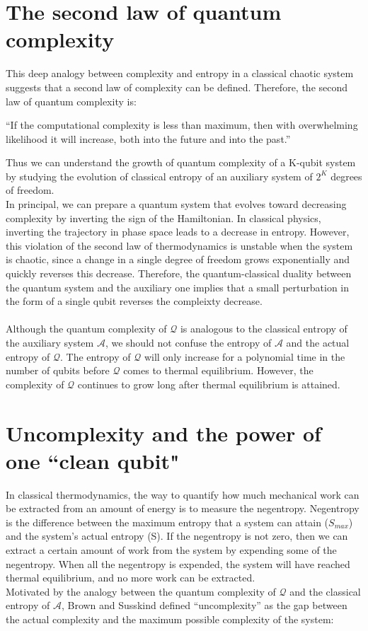 \section{The second law of quantum complexity}
This deep analogy between complexity and entropy in a classical chaotic system suggests that a second law of complexity can be defined. Therefore, the second law of quantum complexity \cite{brown2018second} is: 
\begin{adjustwidth}{0.5cm}{0pt}
 ``If the computational complexity is less than maximum, then with overwhelming likelihood it will increase, both into the future and into the past.''
\end{adjustwidth}
Thus we can understand the growth of quantum complexity of a K-qubit system by studying the evolution of classical entropy of an auxiliary system of $2^K$ degrees of freedom.
\\
In principal, we can prepare a quantum system that evolves toward decreasing complexity by inverting the sign of the Hamiltonian. In classical physics, inverting the trajectory in phase space leads to a decrease in entropy. However, this violation of the second law of thermodynamics is unstable when the system is chaotic, since a change in a single degree of freedom grows exponentially and quickly reverses this decrease. Therefore, the quantum-classical duality between the quantum system and the auxiliary one implies that a small perturbation in the form of a single qubit reverses the compleixty decrease.
\\
\\
Although the quantum complexity of $\mathcal{Q}$ is analogous to the classical entropy of the auxiliary system $\mathcal{A}$, we should not confuse the entropy of $\mathcal{A}$ and the actual entropy of $\mathcal{Q}$. The entropy of $\mathcal{Q}$ will only increase for a polynomial time in the number of qubits before $\mathcal{Q}$ comes to thermal equilibrium. However, the complexity of $\mathcal{Q}$ continues to grow long after thermal equilibrium is attained. 

\section{Uncomplexity and the power of one ``clean qubit"}
In classical thermodynamics, the way to quantify how much mechanical work can be extracted from an amount of energy is to measure the negentropy. Negentropy is the difference between the maximum entropy that a system can attain ($S_{max}$) and the system’s actual entropy (S). If the negentropy is not zero, then we can extract a certain amount of work from the system by expending some of the negentropy. When all the negentropy is expended, the system will have reached thermal equilibrium, and no more work can be extracted.
\\
Motivated by the analogy between the quantum complexity of $\mathcal{Q}$ and the classical entropy of $\mathcal{A}$, Brown and Susskind \cite{brown2018second} defined “uncomplexity” as the gap between the actual complexity and the maximum possible complexity of the system:

